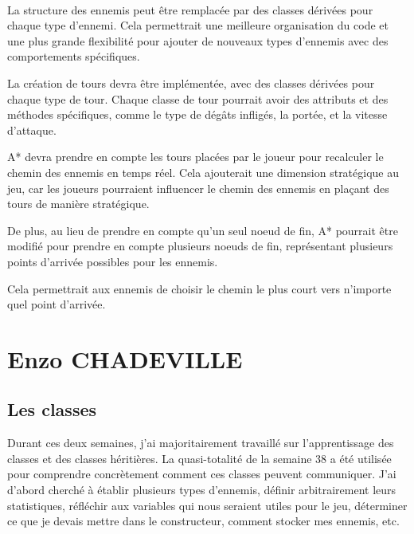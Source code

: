 \paragraph{}

La structure des ennemis peut être remplacée par des classes dérivées pour chaque type d'ennemi. Cela permettrait une meilleure organisation du code et une plus grande flexibilité pour ajouter de nouveaux types d'ennemis avec des comportements spécifiques.


La création de tours devra être implémentée, avec des classes dérivées pour chaque type de tour. Chaque classe de tour pourrait avoir des attributs et des méthodes spécifiques, comme le type de dégâts infligés, la portée, et la vitesse d'attaque.


A* devra prendre en compte les tours placées par le joueur pour recalculer le chemin des ennemis en temps réel. Cela ajouterait une dimension stratégique au jeu, car les joueurs pourraient influencer le chemin des ennemis en plaçant des tours de manière stratégique.

De plus, au lieu de prendre en compte qu'un seul noeud de fin, A* pourrait être modifié pour prendre en compte plusieurs noeuds de fin, représentant plusieurs points d'arrivée possibles pour les ennemis.

Cela permettrait aux ennemis de choisir le chemin le plus court vers n'importe quel point d'arrivée.

\newpage


\newpage

\section{Enzo CHADEVILLE}
\subsection{Les classes}

Durant ces deux semaines, j’ai majoritairement travaillé sur l’apprentissage des classes et des classes héritières. La quasi-totalité de la semaine 38 a été utilisée pour comprendre concrètement comment ces classes peuvent communiquer. J’ai d’abord cherché à établir plusieurs types d’ennemis, définir arbitrairement leurs statistiques, réfléchir aux variables qui nous seraient utiles pour le jeu, déterminer ce que je devais mettre dans le constructeur, comment stocker mes ennemis, etc.

